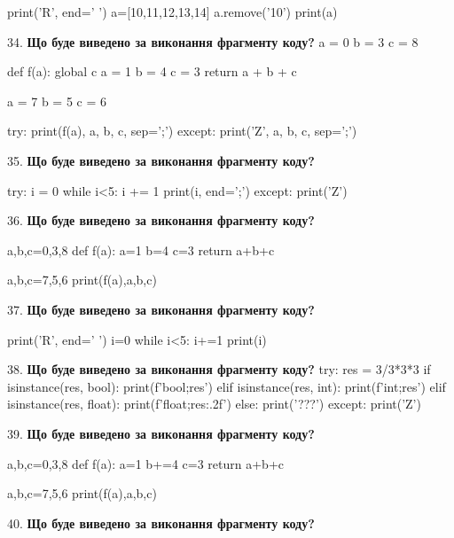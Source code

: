 \documentclass[11pt]{article}
\begin{document}
print('R', end=' ')
a=[10,11,12,13,14]
a.remove('10')
print(a)

\par\vspace{5mm}
34. \textbf{Що буде виведено за виконання фрагменту коду?}
a = 0
b = 3
c = 8

def f(a):
global c    a = 1
    b = 4
    c = 3
    return a + b + c

a = 7
b = 5
c = 6

try:
    print(f(a), a, b, c, sep=';')
except:
    print('Z', a, b, c, sep=';')
\par\vspace{5mm}
35. \textbf{Що буде виведено за виконання фрагменту коду?}

try:
    i = 0
    while i<5:
        i += 1
    print(i, end=';')
except:
    print('Z')

\par\vspace{5mm}
36. \textbf{Що буде виведено за виконання фрагменту коду?}

a,b,c=0,3,8
def f(a):
    a=1
    b=4
    c=3
    return a+b+c

a,b,c=7,5,6
print(f(a),a,b,c)
\par\vspace{5mm}
37. \textbf{Що буде виведено за виконання фрагменту коду?}

print('R', end=' ')
i=0
while i<5:
    i+=1
print(i)

\par\vspace{5mm}
38. \textbf{Що буде виведено за виконання фрагменту коду?}
try:
    res = 3/3*3*3
    if isinstance(res, bool):
        print(f'bool;{res}')
    elif isinstance(res, int):
        print(f'int;{res}')
    elif isinstance(res, float):
        print(f'float;{res:.2f}')
    else:
        print('???')
except:
    print('Z')
\par\vspace{5mm}
39. \textbf{Що буде виведено за виконання фрагменту коду?}

a,b,c=0,3,8
def f(a):
    a=1
    b+=4
    c=3
    return a+b+c

a,b,c=7,5,6
print(f(a),a,b,c)
\par\vspace{5mm}
40. \textbf{Що буде виведено за виконання фрагменту коду?}
\end{document}
